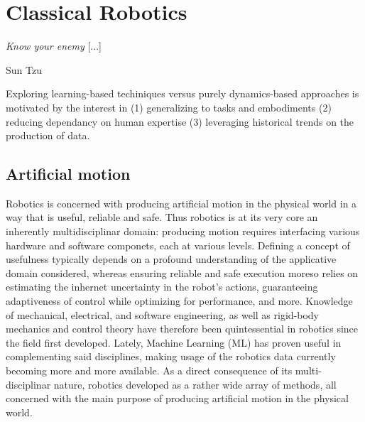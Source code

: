\section{Classical Robotics}

\epigraph{\textit{Know your enemy} [...]}{Sun Tzu}

\begin{tldr}
Exploring learning-based techiniques versus purely dynamics-based approaches is motivated by the interest in (1) generalizing to tasks and embodiments (2) reducing dependancy on human expertise (3) leveraging historical trends on the production of data.
\end{tldr}

\subsection{Artificial motion}
\label{sec:classical}

Robotics is concerned with producing artificial motion in the physical world in a way that is useful, reliable and safe.
Thus robotics is at its very core an inherently multidisciplinar domain: producing motion requires interfacing various hardware and software componets, each at various levels.
Defining a concept of usefulness typically depends on a profound understanding of the applicative domain considered, whereas ensuring reliable and safe execution moreso relies on estimating the inhernet uncertainty in the robot's actions, guaranteeing adaptiveness of control while optimizing for performance, and more.
Knowledge of mechanical, electrical, and software engineering, as well as rigid-body mechanics and control theory have therefore been quintessential in robotics since the field first developed.
Lately, Machine Learning (ML) has proven useful in complementing said disciplines, making usage of the robotics data currently becoming more and more available.
As a direct consequence of its multi-disciplinar nature, robotics developed as a rather wide array of methods, all concerned with the main purpose of producing artificial motion in the physical world.

